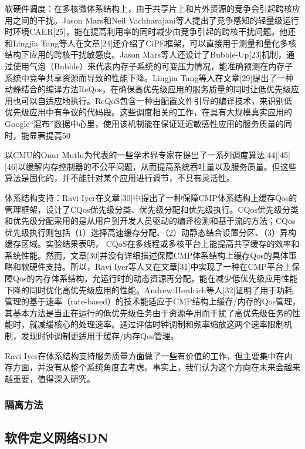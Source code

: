 软硬件调度：在多核微体系结构上，由于共享片上和片外资源的竞争会引起跨核应用之间的干扰。Jason Mars和Neil Vachharajani等人提出了竞争感知的轻量级运行时环境CAER[25]，能在提高利用率的同时减少由竞争引起的跨核干扰问题。他还和Lingjia Tang等人在文章[24]还介绍了CiPE框架，可以直接用于测量和量化多核结构下应用的跨核干扰敏感度。Jason Mars等人还设计了Bubble-Up[23]机制，通过使用气泡（Bubble）来代表内存子系统的可变压力情况，能准确预测在内存子系统中竞争共享资源而导致的性能下降。Lingjia Tang等人在文章[29]提出了一种动静结合的编译方法ReQos，在确保高优先级应用的服务质量的同时让低优先级应用也可以自适应地执行。ReQoS包含一种由配置文件引导的编译技术，来识别低优先级应用中有争议的代码段。这些调度相关的工作，在具有大规模真实应用的Google``混布''数据中心里，使用该机制能在保证延迟敏感性应用的服务质量的同时，能显著提高50%

以CMU的Onur Mutlu为代表的一些学术界专家在提出了一系列调度算法[44][45][46]以缓解内存控制器的不公平问题，从而提高系统吞吐量以及服务质量。但这些算法是固化的，并不能针对某个应用进行调节，不具有灵活性。

体系结构支持：Ravi Iyer在文章[30]中提出了一种保障CMP体系结构上缓存Qos的管理框架，设计了CQos优先级分类、优先级分配和优先级执行。CQos优先级分类和优先级分配采用的是从用户到开发人员驱动的编译检测和基于流的方法；CQos优先级执行则包括（1）选择高速缓存分配、（2）动静态结合设置分区、（3）异构缓存区域。实验结果表明， CQoS在多线程或多核平台上能提高共享缓存的效率和系统性能。然而，文章[30]并没有详细描述保障CMP体系结构上缓存Qos的具体策略和软硬件支持。所以，Ravi Iyer等人又在文章[31]中实现了一种在CMP平台上保障Qos的内存体系结构，允运行时的动态资源再分配，能在减少低优先级应用性能下降的同时优化高优先级应用的性能。Andrew Herdrich等人[32]证明了用于功耗管理的基于速率（rate-based）的技术能适应于CMP结构上缓存/内存的Qos管理，其基本方法是当正在运行的低优先级任务由于资源争用而干扰了高优先级任务的性能时，就减缓核心的处理速率。通过评估时钟调制和频率缩放这两个速率限制机制，发现时钟调制更适用于缓存/内存Qos管理。

Ravi Iyer在体系结构支持服务质量方面做了一些有价值的工作，但主要集中在内存方面，并没有从整个系统角度去考虑。事实上，我们认为这个方向在未来会越来越重要，值得深入研究。
 

\subsubsection*{隔离方法}
\fi

\subsection{软件定义网络SDN}
\label{sec:background:sdn}

